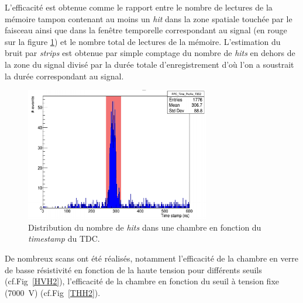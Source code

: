 L'efficacité est obtenue comme le rapport entre le nombre de lectures de la mémoire tampon contenant au moins un \textit{hit} dans la zone spatiale touchée par le faisceau ainsi que dans la fenêtre temporelle correspondant au signal (en rouge sur la figure \ref{struch2}) et le nombre total de lectures de la mémoire. L'estimation du bruit par \textit{strips} est obtenue par simple comptage du nombre de \textit{hits} en dehors de la zone du signal divisé par la durée totale d'enregistrement d'où l'on a soustrait la durée correspondant au signal.

\begin{figure}[!ht]
	\centering
	\includegraphics[width=0.72\textwidth]{GLA/STRUCH2.png}
	\caption{Distribution du nombre de \textit{hits} dans une chambre en fonction du \textit{timestamp} du TDC.}
	\label{struch2}
\end{figure}

De nombreux scans ont été réalisés, notamment l'efficacité de la chambre en verre de basse résistivité en fonction de la haute tension pour différents seuils (cf.Fig~\ref{HVH2}), l'efficacité de la chambre en fonction du seuil à tension fixe (\SI{7000}{\volt}) (cf.Fig~\ref{THH2}).

